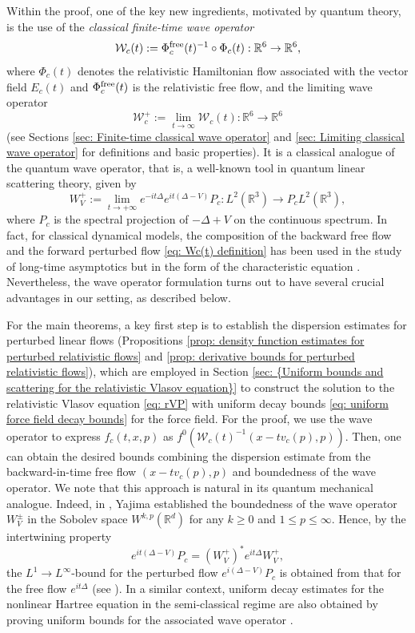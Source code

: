 \documentclass[reqno, 11pt, letterpaper]{amsart}
\theoremstyle{remark}
\numberwithin{equation}{section}
\numberwithin{theorem}{section}
\numberwithin{table}{section}
\numberwithin{figure}{section}
\begin{document}
Within the proof, one of the key new ingredients, motivated by quantum theory, is the use of the \textit{classical finite-time wave operator}
\begin{equation}\label{eq: Wc(t) definition}
\mathcal{W}_c(t):=\Phi_c^{\textup{free}}(t)^{-1}\circ\Phi_c(t):\mathbb{R}^6\to\mathbb{R}^6,
\end{equation}
where $\Phi_c(t)$ denotes the relativistic Hamiltonian flow associated with the vector field $E_c(t)$ and $\Phi_c^{\textup{free}}(t)$ is the relativistic free flow, and the limiting wave operator 
$$\mathcal{W}_c^+:=\lim_{t\to\infty} \mathcal{W}_c(t):\mathbb{R}^6\to\mathbb{R}^6$$
(see Sections \ref{sec: Finite-time classical wave operator} and \ref{sec: Limiting classical wave operator} for definitions and basic properties). It is a classical analogue of the quantum wave operator, that is, a well-known tool in quantum linear scattering theory, given by 
$$W_V^+:=\lim_{t\to+\infty}e^{-it\Delta} e^{it(\Delta-V)}P_c: L^2(\mathbb{R}^3)\to P_cL^2(\mathbb{R}^3),$$
where $P_c$ is the spectral projection of $-\Delta+V$ on the continuous spectrum. In fact, for classical dynamical models, the composition of the backward free flow and the forward perturbed flow \eqref{eq: Wc(t) definition} has been used in the study of long-time asymptotics but in the form of the characteristic equation \cite{Pankavich2, Pankavich1, Pankavich3}. Nevertheless, the wave operator formulation turns out to have several crucial advantages in our setting, as described below.

For the main theorems, a key first step is to establish the dispersion estimates for perturbed linear flows (Propositions \ref{prop: density function estimates for perturbed relativistic flows} and \ref{prop: derivative bounds for perturbed relativistic flows}), which are employed in Section \ref{sec: {Uniform bounds and scattering for the relativistic Vlasov equation}} to construct the solution to the relativistic Vlasov equation \eqref{eq: rVP} with uniform decay bounds \eqref{eq: uniform force field decay bounds} for the force field. For the proof, we use the wave operator to express $f_c(t,x,p)$ as $f^0(\mathcal{W}_c(t)^{-1}(x-tv_c(p),p))$. Then, one can obtain the desired bounds combining the dispersion estimate from the backward-in-time free flow $(x-tv_c(p),p)$ and boundedness of the wave operator. We note that this approach is natural in its quantum mechanical analogue. Indeed, in \cite{Yajima}, Yajima established the boundedness of the wave operator $W_V^\pm$ in the Sobolev space $W^{k,p}(\mathbb{R}^d)$ for any $k\geq 0$ and $1\leq p\leq\infty$. Hence, by the intertwining property
$$ e^{it(\Delta-V)}P_c=(W_V^+)^*e^{it\Delta}W_V^+,$$ the $L^1 \to L^\infty$-bound for the perturbed flow $e^{i(\Delta-V)}P_c$ is obtained from that for the free flow $e^{it\Delta}$ (see \cite[Theorem 1.3]{Yajima}). In a similar context, uniform decay estimates for the nonlinear Hartree equation in the semi-classical regime are also obtained by proving uniform bounds for the associated wave operator \cite{Hadama, HadamaHong}.
\end{document}
